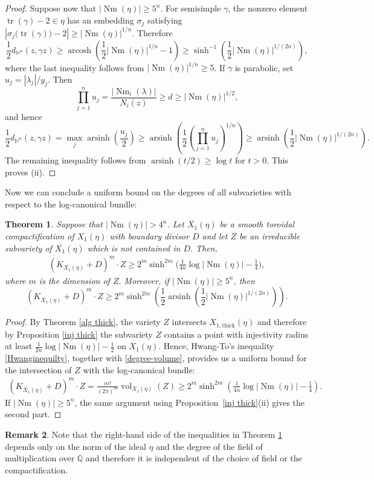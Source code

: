 \documentclass[12 pt]{amsart}
\newtheorem{theorem}{Theorem}[section]
\theoremstyle{definition}
\newtheorem{Remark}[theorem]{Remark}
\newcommand{\Q}{\mathbb{Q}} %
\newcommand{\bi}{\big}
\newcommand{\Xb}{\overline{X_{1}}}
\newcommand{\Nm}{\operatorname{Nm}}
\newcommand{\Hu}{\mathbb{H}}
\begin{document}
\begin{proof}
Suppose now that \(|\Nm(\eta)|\ge5^n\). For semisimple \(\gamma\), the nonzero element \(\operatorname{tr}(\gamma)-2\in\eta\) has an embedding \(\sigma_j\) satisfying
\(
\left|\sigma_j\bigl(\operatorname{tr}(\gamma)\bigr)-2\right|\ge|\Nm(\eta)|^{1/n}.
\)
Therefore
\[
\frac12d_{\Hu^n}(z,\gamma z)
\ge\operatorname{arcosh}\left(\frac12|\Nm(\eta)|^{1/n}-1\right)
\ge\sinh^{-1}\left(\frac12|\Nm(\eta)|^{1/(2n)}\right),
\]
where the last inequality follows from \(|\Nm(\eta)|^{1/n}\ge5\). If $\gamma$ is parabolic, set $u_j=|\lambda_j|/y_j$. Then
\[
\prod_{j=1}^nu_j=\frac{|\Nm_i(\lambda)|}{N_i(z)}\ge d\ge|\Nm(\eta)|^{1/2},
\]
and hence
\[
\frac12d_{\Hu^n}(z,\gamma z)=\max_j\operatorname{arsinh}\left(\frac{u_j}{2}\right)
\ge\operatorname{arsinh}\left(\frac12\left(\prod_{j=1}^nu_j\right)^{1/n}\right)
\ge\operatorname{arsinh}\left(\frac12|\Nm(\eta)|^{1/(2n)}\right).
\]
The remaining inequality follows from $\operatorname{arsinh}(t/2)\ge\log t$ for $t>0$. This proves (ii).
\end{proof}



Now we can conclude a uniform bound on the degrees of all subvarieties with respect to the log-canonical bundle:  
\begin{theorem}\label{log deg} Suppose that $|\Nm(\eta)|>4^n$. Let $\Xb(\eta)$ be a smooth toroidal compactification of $X_1(\eta)$ with boundary divisor $D$ and let $Z$ be an irreducible subvariety of $\Xb(\eta)$ which is not contained in $D.$ Then,
\begin{align*}
    (K_{\Xb(\eta)}+D)^m \cdot Z
    \ge
    2^m\sinh^{2m}\bi( \frac{1}{4n}\log |\Nm(\eta)|-\frac{1}{4}\bi),
\end{align*}
where $m$ is the dimension of $Z.$ Moreover, if $|\Nm(\eta)|\ge5^n$, then
\[
(K_{\Xb(\eta)}+D)^m\cdot Z
\ge2^m\sinh^{2m}\left(\frac12\operatorname{arsinh}\left(\frac12|\Nm(\eta)|^{1/(2n)}\right)\right).
\]
\end{theorem}
\begin{proof}
By Theorem \ref{alg thick}, the variety $Z$ intersects $X_{1,\mathrm{thick}}(\eta)$ and therefore by Proposition \ref{inj thick} the subvariety $Z$ contains a point with injectivity radius at least $\frac{1}{2n}\log |\Nm(\eta)|-\frac12$ on $X_1(\eta).$ Hence, Hwang-To's inequality \eqref{Hwanginequilty}, together with \eqref{degree-volume}, provides us a uniform bound for the intersection of $Z$ with the log-canonical bundle:
\begin{align*}
    (K_{\Xb(\eta)}+D)^m \cdot Z =  \frac{m!}{(2\pi)^m}\operatorname{vol}_{X_1(\eta)}(Z)
    \ge 
    2^m\sinh^{2m}( \frac{1}{4n}\log |\Nm(\eta)|-\frac{1}{4}).
\end{align*}
If $|\Nm(\eta)|\ge5^n$, the same argument using Proposition~\ref{inj thick}(ii) gives the second part. \end{proof}
\begin{Remark} Note that the right-hand side of the inequalities in Theorem \ref{log deg} depends only on the norm of the ideal $\eta$ and the degree of the field of multiplication over $\Q$ and therefore it is independent of the choice of field or the compactification.   
\end{Remark}
\end{document}
